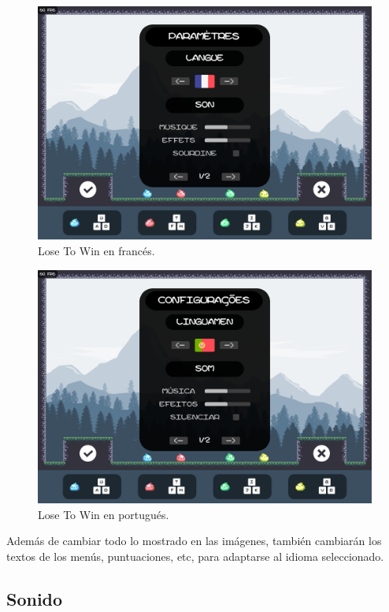 \documentclass[12pt, spanish]{article}
\begin{document}
\begin{figure}[H]
	\centering
	\includegraphics[width=\textwidth]{"opciones/idiomas/french.png"}
	\caption{Lose To Win en francés.}\label{figure:french}
\end{figure}

\begin{figure}[H]
	\centering
	\includegraphics[width=\textwidth]{"opciones/idiomas/portuguese.png"}
	\caption{Lose To Win en portugués.}\label{figure:portuguese}
\end{figure}


Además de cambiar todo lo mostrado en las imágenes, también cambiarán los textos de los menús, puntuaciones, etc, para adaptarse al idioma seleccionado.

\newpage

\subsection{Sonido}
\end{document}

